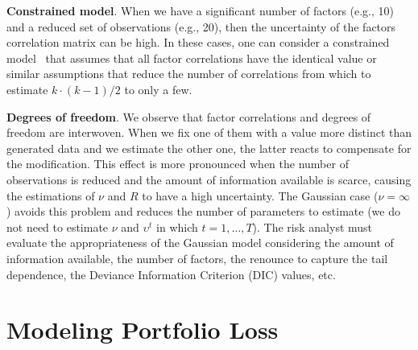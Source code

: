 \documentclass[11pt,fleqn]{book} %
\begin{document}
\textbf{Constrained model}. When we have a significant number of factors 
(e.g., 10) and a reduced set of observations (e.g., 20), then the uncertainty 
of the factors correlation matrix can be high. In these cases, one can consider 
a constrained model~\cite{roncalli:2004} that assumes that all factor
correlations have the identical value or similar assumptions that reduce the 
number of correlations from which to estimate $k \cdot(k-1)/2$ to only a few.

\textbf{Degrees of freedom}. We observe that factor correlations and degrees 
of freedom are interwoven. When we fix one of them with a value more distinct 
than generated data and we estimate the other one, the latter reacts to 
compensate for the modification. This effect is more pronounced when the 
number of observations is reduced and the amount of 
information available is scarce, causing the estimations of $\nu$ and $R$
to have a high uncertainty. The Gaussian case ($\nu = \infty$) avoids this 
problem and reduces the number of parameters to estimate (we do not need to 
estimate $\nu$ and $\upsilon^t$ in which $t=1,\dots,T$). 
The risk analyst must evaluate the appropriateness of the Gaussian model 
considering the amount of information available, the number of factors, 
the renounce to capture the tail dependence, the Deviance Information 
Criterion (DIC) values, etc.


\chapter{Modeling Portfolio Loss}

\end{document}
